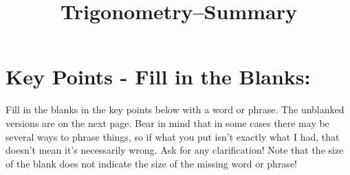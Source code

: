 \documentclass{article}
\begin{document}
\title{Trigonometry--Summary}
\date{}

\maketitle
\thispagestyle{empty}
\pagestyle{empty}

\Large

\section{Key Points - Fill in the Blanks:}

Fill in the blanks in the key points below with a word or phrase. The unblanked versions are on the next page. Bear in mind that in some cases there may be several ways to phrase things, so if what you put isn't exactly what I had, that doesn't mean it's necessarily wrong. Ask for any clarification! Note that the size of the blank does not indicate the size of the missing word or phrase!
\end{document}

